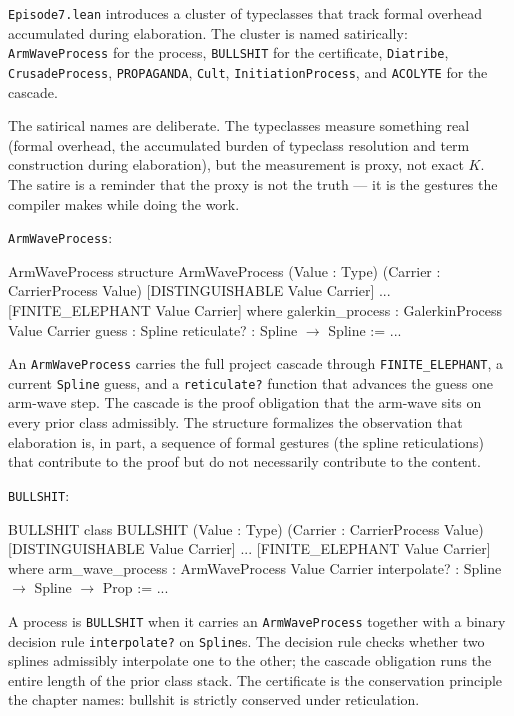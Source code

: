 \texttt{Episode7.lean} introduces a cluster of typeclasses that track
formal overhead accumulated during elaboration. The cluster is named
satirically: \texttt{ArmWaveProcess} for the process,
\texttt{BULLSHIT} for the certificate, \texttt{Diatribe},
\texttt{CrusadeProcess}, \texttt{PROPAGANDA}, \texttt{Cult},
\texttt{InitiationProcess}, and \texttt{ACOLYTE} for the cascade.

The satirical names are deliberate. The typeclasses measure something
real (formal overhead, the accumulated burden of typeclass resolution
and term construction during elaboration), but the measurement is
proxy, not exact $K$. The satire is a reminder that the proxy is
not the truth --- it is the gestures the compiler makes while doing
the work.

\texttt{ArmWaveProcess}:

\begin{leanexcerpt}{ArmWaveProcess}
structure ArmWaveProcess
    (Value : Type)
    (Carrier : CarrierProcess Value)
    [DISTINGUISHABLE Value Carrier] ... [FINITE_ELEPHANT Value Carrier]
  where
  galerkin_process : GalerkinProcess Value Carrier
  guess            : Spline
  reticulate?      : Spline $\to$ Spline := ...
\end{leanexcerpt}

An \texttt{ArmWaveProcess} carries the full project cascade
through \texttt{FINITE\_ELEPHANT}, a current \texttt{Spline} guess,
and a \texttt{reticulate?} function that advances the guess one
arm-wave step. The cascade is the proof obligation that the
arm-wave sits on every prior class admissibly. The structure
formalizes the observation that elaboration is, in part, a
sequence of formal gestures (the spline reticulations) that
contribute to the proof but do not necessarily contribute to the
content.

\texttt{BULLSHIT}:

\begin{leanexcerpt}{BULLSHIT}
class BULLSHIT
    (Value : Type)
    (Carrier : CarrierProcess Value)
    [DISTINGUISHABLE Value Carrier] ... [FINITE_ELEPHANT Value Carrier]
  where
  arm_wave_process : ArmWaveProcess Value Carrier
  interpolate?     : Spline $\to$ Spline $\to$ Prop := ...
\end{leanexcerpt}

A process is \texttt{BULLSHIT} when it carries an
\texttt{ArmWaveProcess} together with a binary decision rule
\texttt{interpolate?} on \texttt{Spline}s. The decision rule
checks whether two splines admissibly interpolate one to the
other; the cascade obligation runs the entire length of the prior
class stack. The certificate is the conservation principle the
chapter names: bullshit is strictly conserved under reticulation.

